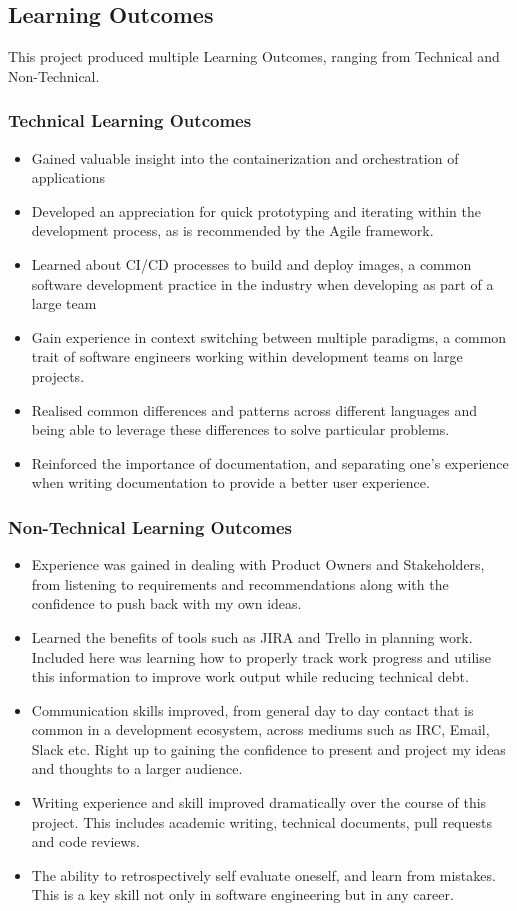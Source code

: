 \newpage
\subsection{Learning Outcomes}
This project produced multiple Learning Outcomes, ranging from Technical and Non-Technical.
\subsubsection{Technical Learning Outcomes}
\begin{itemize}
    \item Gained valuable insight into the containerization and orchestration of applications
    \item Developed an appreciation for quick prototyping and iterating within the development process, as is recommended by the Agile framework.
    \item Learned about CI/CD processes to build and deploy images, a common software development practice in the industry when developing as part of a large team
    \item Gain experience in context switching between multiple paradigms, a common trait of software engineers working within development teams on large projects.
    \item Realised common differences and patterns across different languages and being able to leverage these differences to solve particular problems.
    \item Reinforced the importance of documentation, and separating one's experience when writing documentation to provide a better user experience.
\end{itemize}
\subsubsection{Non-Technical Learning Outcomes}
\begin{itemize}
    \item Experience was gained in dealing with Product Owners and Stakeholders, from listening to requirements and recommendations along with the confidence to push back with my own ideas.
    \item Learned the benefits of tools such as JIRA and Trello in planning work. Included here was learning how to properly track work progress and utilise this information to improve work output while reducing technical debt.
    \item Communication skills improved, from general day to day contact that is common in a development ecosystem, across mediums such as IRC, Email, Slack etc. Right up to gaining the confidence to present and project my ideas and thoughts to a larger audience. 
    \item Writing experience and skill improved dramatically over the course of this project. This includes academic writing, technical documents, pull requests and code reviews.
    \item The ability to retrospectively self evaluate oneself, and learn from mistakes. This is a key skill not only in software engineering but in any career.
\end{itemize}
\clearpage
